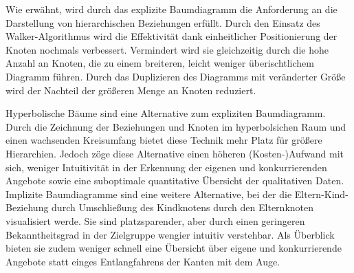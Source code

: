 \documentclass[usegeometry=true]{scrartcl}
\begin{document}
Wie erwähnt, wird durch das explizite Baumdiagramm die Anforderung an die Darstellung von hierarchischen Beziehungen erfüllt.
Durch den Einsatz des Walker-Algorithmus wird die Effektivität dank einheitlicher Positionierung der Knoten nochmals verbessert.\cite[688ff.]{Walker.1990}
Vermindert wird sie gleichzeitig durch die hohe Anzahl an Knoten, die zu einem breiteren, leicht weniger überischtlichem Diagramm führen. 
Durch das Duplizieren des Diagramms mit veränderter Größe wird der Nachteil der größeren Menge an Knoten reduziert.

Hyperbolische Bäume sind eine Alternative zum expliziten Baumdiagramm. 
Durch die Zeichnung der Beziehungen und Knoten im hyperbolsichen Raum und einen wachsenden Kreisumfang bietet diese Technik mehr Platz für größere Hierarchien.\cite[2f.]{Lamping.1995}
Jedoch zöge diese Alternative einen höheren (Kosten-)Aufwand mit sich, weniger Intuitivität in der Erkennung der eigenen und konkurrierenden Angebote sowie eine suboptimale quantitative Übersicht der qualitativen Daten. 
Implizite Baumdiagramme sind eine weitere Alternative, bei der die Eltern-Kind-Beziehung durch Umschließung des Kindknotens durch den Elternknoten visualisiert werde.\cite[394]{Schulz.2011}
Sie sind platzsparender, aber durch einen geringeren Bekanntheitsgrad in der Zielgruppe wengier intuitiv verstehbar. 
Als Überblick bieten sie zudem weniger schnell eine Übersicht über eigene und konkurrierende Angebote statt einges Entlangfahrens der Kanten mit dem Auge.


\end{document}
